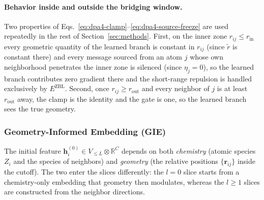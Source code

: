 \paragraph{Behavior inside and outside the bridging window.}
Two properties of Eqs.~\eqref{eq:dpa4-clamp}--\eqref{eq:dpa4-source-freeze} are used repeatedly in the rest of Section~\ref{sec:methods}.
First, on the inner zone $r_{ij}\le r_{\mathrm{in}}$ every geometric quantity of the learned branch is constant in $r_{ij}$ (since $\widetilde r$ is constant there) and every message sourced from an atom $j$ whose own neighborhood penetrates the inner zone is silenced (since $\eta_j=0$), so the learned branch contributes zero gradient there and the short-range repulsion is handled exclusively by $E^{\mathrm{ZBL}}$.
Second, once $r_{ij}\ge r_{\mathrm{out}}$ and every neighbor of $j$ is at least $r_{\mathrm{out}}$ away, the clamp is the identity and the gate is one, so the learned branch sees the true geometry.

\subsubsection{Geometry-Informed Embedding (GIE)}
\label{sec:gie}

The initial feature $\mathbf{h}_i^{(0)}\in V_{\leq L}\otimes\mathbb{R}^{C}$ depends on both \emph{chemistry} (atomic species $Z_i$ and the species of neighbors) and \emph{geometry} (the relative positions $\{\mathbf{r}_{ij}\}$ inside the cutoff).
The two enter the slices differently: the $l=0$ slice starts from a chemistry-only embedding that geometry then modulates, whereas the $l\geq 1$ slices are constructed from the neighbor directions.

